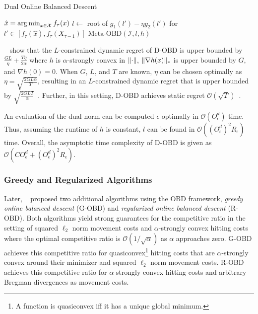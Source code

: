 \begin{algorithm}
    \caption{Dual Online Balanced Descent~\cite{Chen2018}}\label{alg:md:dobd}
    $\hat{x} = \operatorname*{arg\,min}_{x \in \mathcal{X}} f_{\tau}(x)$\;
    $l \gets $ root of $g_1(l') - \eta g_2(l')$ for $l' \in [f_{\tau}(\hat{x}), f_{\tau}(X_{\tau-1})]$\;
    \Return $\text{Meta-OBD}(\mathcal{I}, l, h)$\;
\end{algorithm}

\citeauthor{Chen2018}~\cite{Chen2018} show that the $L$-constrained dynamic regret of D-OBD is upper bounded by $\frac{G L}{\eta} + \frac{T \eta}{2 \alpha}$ where $h$ is $\alpha$-strongly convex in $\lVert\cdot\rVert$, $\lVert\nabla h(x)\rVert_*$ is upper bounded by $G$, and $\nabla h(0) = 0$. When $G$, $L$, and $T$ are known, $\eta$ can be chosen optimally as $\eta = \sqrt{\frac{2 G L \alpha}{T}}$, resulting in an $L$-constrained dynamic regret that is upper bounded by $\sqrt{\frac{2 G L T}{\alpha}}$~\cite{Chen2018}. Further, in this setting, D-OBD achieves static regret $\mathcal{O}(\sqrt{T})$~\cite{Chen2018}.

An evaluation of the dual norm can be computed $\epsilon$-optimally in $\mathcal{O}(O_{\epsilon}^d)$ time. Thus, assuming the runtime of $h$ is constant, $l$ can be found in $\mathcal{O}((O_{\epsilon}^d)^2 R_{\epsilon})$ time. Overall, the asymptotic time complexity of D-OBD is given as $\mathcal{O}(C O_{\epsilon}^d + (O_{\epsilon}^d)^2 R_{\epsilon})$.

\subsubsection{Greedy and Regularized Algorithms}

Later, \citeauthor{Goel2019}~\cite{Goel2019} proposed two additional algorithms using the OBD framework, \emph{greedy online balanced descent} (G-OBD) and \emph{regularized online balanced descent} (R-OBD). Both algorithms yield strong guarantees for the competitive ratio in the setting of squared $\ell_2$ norm movement costs and $\alpha$-strongly convex hitting costs where the optimal competitive ratio is $\mathcal{O}(1 / \sqrt{\alpha})$ as $\alpha$ approaches zero. G-OBD achieves this competitive ratio for quasiconvex\footnote{A function is quasiconvex iff it has a unique global minimum.} hitting costs that are $\alpha$-strongly convex around their minimizer and squared $\ell_2$ norm movement costs. R-OBD achieves this competitive ratio for $\alpha$-strongly convex hitting costs and arbitrary Bregman divergences as movement costs.

